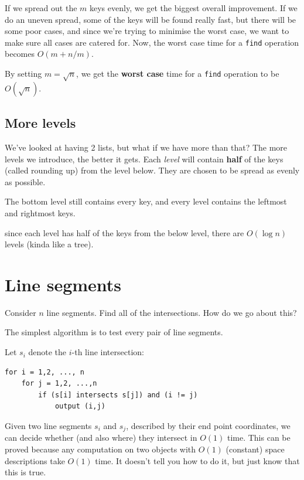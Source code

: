 \documentclass[11pt,a4paper,titlepage,dvipsnames,cmyk]{scrartcl}
\begin{document}
If we spread out the $m$ keys evenly, we get the biggest overall
improvement. If we do an uneven spread, some of the keys will be found
really fast, but there will be some poor cases, and since we're trying to
minimise the worst case, we want to make sure all cases are catered for.
Now, the worst case time for a \lstinline|find| operation becomes $O(m +
n/m)$.

By setting $m = \sqrt{n}$, we get the \textbf{worst case} time for a
\lstinline|find|  operation to be $O(\sqrt{n})$.

\subsection{More levels}%
\label{sub:levels}
We've looked at having 2 lists, but what if we have more than that? The
more levels we introduce, the better it gets. Each \textit{level} will
contain \textbf{half} of the keys (called rounding up) from the level
below. They are chosen to be spread as evenly as possible.

The bottom level still contains every key, and every level contains the
leftmost and rightmost keys.

since each level has half of the keys from the below level, there are
$O(\log n)$ levels (kinda like a tree). 


\section{Line segments}%
\label{sec:line-segments}
Consider $n$ line segments. Find all of the intersections. How do we go
about this?

The simplest algorithm is to test every pair of line segments.

Let $s_i$ denote the $i$-th line intersection:
\begin{lstlisting}
for i = 1,2, ..., n
    for j = 1,2, ...,n
        if (s[i] intersects s[j]) and (i != j)
            output (i,j)
\end{lstlisting}

Given two line segments $s_i$ and $s_j$, described by their end point
coordinates, we can decide whether (and also where) they intersect in
$O(1)$ time. This can be proved because any computation on two objects
with $O(1)$ (constant) space descriptions take $O(1)$ time. It doesn't
tell you how to do it, but just know that this is true.
\end{document}
